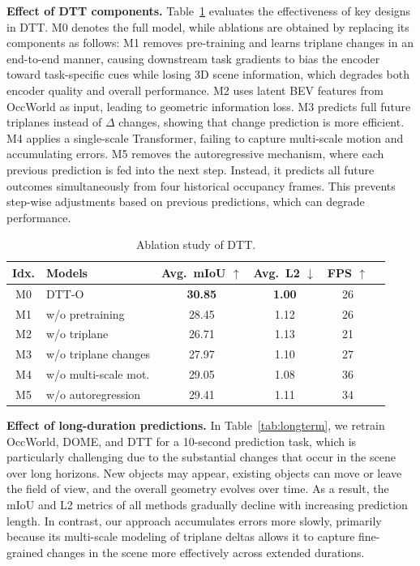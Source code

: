 \documentclass[11pt,a4paper]{article}
\begin{document}
\textbf{Effect of DTT components.}
Table~\ref{tab:ablation} evaluates the effectiveness of key designs in DTT.
M0 denotes the full model, while ablations are obtained by replacing its components as follows:
M1 removes pre-training and learns triplane changes in an end-to-end manner, causing downstream task gradients to bias the encoder toward task-specific cues while losing 3D scene information, which degrades both encoder quality and overall performance.
M2 uses latent BEV features from OccWorld as input, leading to geometric information loss.
M3 predicts full future triplanes instead of $\Delta$ changes, showing that change prediction is more efficient.
M4 applies a single-scale Transformer, failing to capture multi-scale motion and accumulating errors.
M5 removes the autoregressive mechanism, where each previous prediction is fed into the next step. Instead, it predicts all future outcomes simultaneously from four historical occupancy frames.
This prevents step-wise adjustments based on previous predictions, which can degrade performance.

\begin{table}[htbp]
  \centering
  \caption{Ablation study of DTT.}
  \label{tab:ablation}
  \begin{tabular}{clcccc}
    \toprule
    Idx. & Models & Avg.\ mIoU $\uparrow$ & Avg.\ L2 $\downarrow$ & FPS $\uparrow$ \\
    \midrule
    M0 & DTT-O                    & \textbf{30.85} & \textbf{1.00} & 26 \\
    M1 & w/o pretraining          & 28.45 & 1.12 & 26 \\
    M2 & w/o triplane             & 26.71 & 1.13 & 21 \\
    M3 & w/o triplane changes     & 27.97 & 1.10 & 27 \\
    M4 & w/o multi-scale mot.     & 29.05 & 1.08 & 36 \\
    M5 & w/o autoregression       & 29.41 & 1.11 & 34 \\
    \bottomrule
  \end{tabular}
\end{table}

\textbf{Effect of long-duration predictions.}
In Table~\ref{tab:longterm}, we retrain OccWorld, DOME, and DTT for a 10-second prediction task, which is particularly challenging due to the substantial changes that occur in the scene over long horizons.
New objects may appear, existing objects can move or leave the field of view, and the overall geometry evolves over time.
As a result, the mIoU and L2 metrics of all methods gradually decline with increasing prediction length.
In contrast, our approach accumulates errors more slowly, primarily because its multi-scale modeling of triplane deltas allows it to capture fine-grained changes in the scene more effectively across extended durations.
\end{document}
